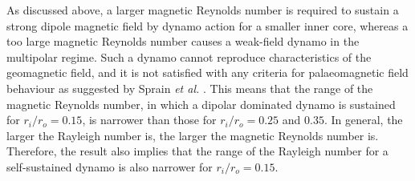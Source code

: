 

As discussed above, a larger magnetic Reynolds number is required to sustain a strong dipole magnetic field by dynamo action for a smaller inner core, whereas a too large magnetic Reynolds number causes a weak-field dynamo in the multipolar regime.
Such a dynamo cannot reproduce characteristics of the geomagnetic field, and it is not satisfied with any criteria for palaeomagnetic field behaviour as suggested by Sprain {\it et al.} .
This means that the range of the magnetic Reynolds number, in which a dipolar dominated dynamo is sustained for $r_i / r_o = 0.15$, is narrower than those for $r_i / r_o = 0.25$ and $0.35$.
In general, the larger the Rayleigh number is, the larger the magnetic Reynolds number is.
Therefore, the result also implies that the range of the Rayleigh number for a self-sustained dynamo is also narrower for $r_i / r_o = 0.15$.

